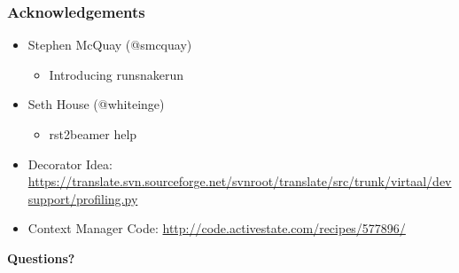 \documentclass[t]{beamer}
\begin{document}
\begin{frame}[fragile]
\frametitle{Acknowledgements}

\begin{itemize}

\item Stephen McQuay (@smcquay)
\begin{itemize}

\item Introducing runsnakerun
\end{itemize}

\item Seth House (@whiteinge)
\begin{itemize}

\item rst2beamer help
\end{itemize}

\item Decorator Idea:
\url{https://translate.svn.sourceforge.net/svnroot/translate/src/trunk/virtaal/devsupport/profiling.py}

\item Context Manager Code:
\url{http://code.activestate.com/recipes/577896/}
\end{itemize}

\textbf{Questions?}
\end{frame}
\end{document}

